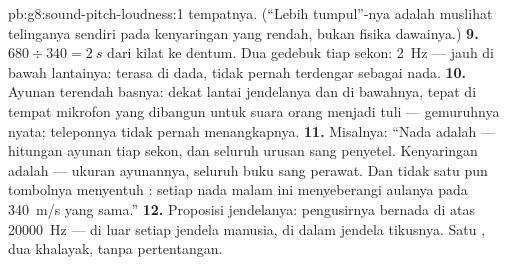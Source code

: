 \begin{solution}{pb:g8:sound-pitch-loudness:1}
tempatnya. (``Lebih tumpul''-nya adalah muslihat telinganya sendiri
pada kenyaringan yang rendah, bukan fisika dawainya.)
\textbf{9.} $680 \div 340 = \qty{2}{s}$ dari kilat ke dentum. Dua
gedebuk tiap sekon: \qty{2}{Hz} --- jauh di bawah lantainya: terasa di
dada, tidak pernah terdengar sebagai nada.
\textbf{10.} Ayunan terendah basnya: dekat lantai jendelanya dan di
bawahnya, tepat di tempat mikrofon yang dibangun untuk suara orang
menjadi tuli --- gemuruhnya nyata; teleponnya tidak pernah
menangkapnya.
\textbf{11.} Misalnya: ``Nada adalah  --- hitungan ayunan
tiap sekon, dan seluruh urusan sang penyetel. Kenyaringan adalah
 --- ukuran ayunannya, seluruh buku sang perawat. Dan tidak
satu pun tombolnya menyentuh : setiap nada malam ini
menyeberangi aulanya pada \qty{340}{m/s} yang sama.''
\textbf{12.} Proposisi jendelanya: pengusirnya bernada di atas
\qty{20000}{Hz} --- di luar setiap jendela manusia, di dalam jendela
tikusnya. Satu , dua khalayak, tanpa pertentangan.
\end{solution}
